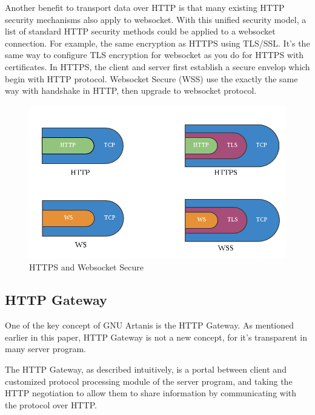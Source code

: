 \documentclass[numbers,numberedpars]{sigplanconf}
\begin{document}
Another benefit to transport data over HTTP is that many existing HTTP security mechanisms also apply to websocket.
With this unified security model, a list of standard HTTP security methods could be applied to a websocket connection.
For example, the same encryption as HTTPS using TLS/SSL. It's the same way to configure TLS encryption for websocket as you do for HTTPS with
certificates. In HTTPS, the client and server first establish a secure envelop which begin with HTTP protocol. Websocket Secure (WSS) use
the exactly the same way with handshake in HTTP, then upgrade to websocket protocol. 

\begin{figure}[tbph]
  \centering
  \label{fig:wss}
  \includegraphics[scale=0.3]{wss.png}
  \caption{HTTPS and Websocket Secure}
\end{figure}

\subsection{HTTP Gateway} \label{HTTP Gateway}

One of the key concept of GNU Artanis is the HTTP Gateway. As mentioned earlier in this paper, HTTP Gateway is not a new concept,
for it's transparent in many server program.

The HTTP Gateway, as described intuitively, is a portal between client and customized protocol processing module of the server program,
and taking the HTTP negotiation to allow them to share information by communicating with the protocol over HTTP.
\end{document}
